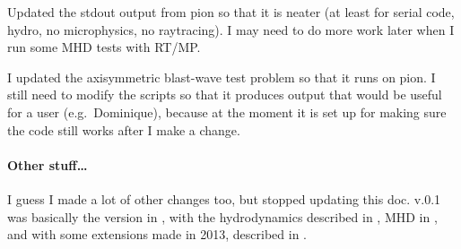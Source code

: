 \documentclass[a4paper,11pt]{article}
\begin{document}
Updated the stdout output from pion so that it is neater (at least for serial code, hydro, no microphysics, no raytracing).  I may need to do more work later when I run some MHD tests with RT/MP.

I updated the axisymmetric blast-wave test problem so that it runs on pion.
I still need to modify the scripts so that it produces output that would be useful for a user (e.g.\ Dominique), because at the moment it is set up for making sure the code still works after I make a change.

\paragraph{Other stuff\ldots}
I guess I made a lot of other changes too, but stopped updating this doc.
\pion{} v.0.1 was basically the version in \citet{Mac12}, with the hydrodynamics described in \citet{MacLim10}, MHD in \citet{MacLim11}, and with some extensions made in 2013, described in \citet{MacLanGva13}.





\end{document}
